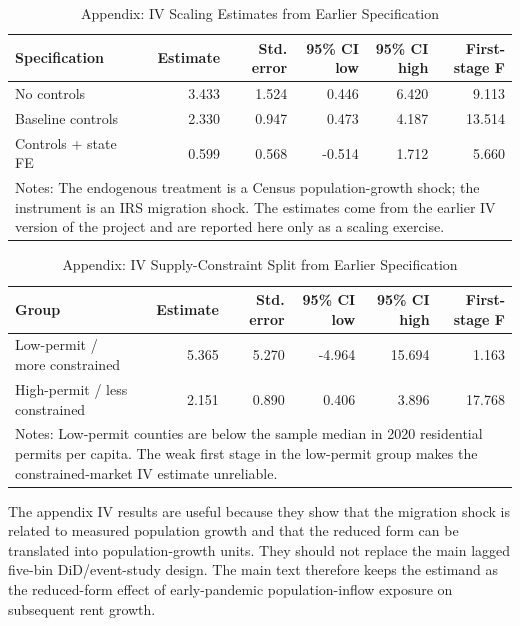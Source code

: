 \documentclass[11pt]{article}
\begin{document}
\begin{table}[H]\centering
\caption{Appendix: IV Scaling Estimates from Earlier Specification}
\label{tab:iv_appendix}
\begin{tabular}{lrrrrr}
\toprule
Specification & Estimate & Std. error & 95\% CI low & 95\% CI high & First-stage F \\
\midrule
No controls & 3.433 & 1.524 & 0.446 & 6.420 & 9.113 \\
Baseline controls & 2.330 & 0.947 & 0.473 & 4.187 & 13.514 \\
Controls + state FE & 0.599 & 0.568 & -0.514 & 1.712 & 5.660 \\
\bottomrule
\multicolumn{6}{p{0.88\textwidth}}{\footnotesize Notes: The endogenous treatment is a Census population-growth shock; the instrument is an IRS migration shock. The estimates come from the earlier IV version of the project and are reported here only as a scaling exercise.}
\end{tabular}
\end{table}

\begin{table}[H]\centering
\caption{Appendix: IV Supply-Constraint Split from Earlier Specification}
\label{tab:iv_supply_appendix}
\begin{tabular}{lrrrrr}
\toprule
Group & Estimate & Std. error & 95\% CI low & 95\% CI high & First-stage F \\
\midrule
Low-permit / more constrained & 5.365 & 5.270 & -4.964 & 15.694 & 1.163 \\
High-permit / less constrained & 2.151 & 0.890 & 0.406 & 3.896 & 17.768 \\
\bottomrule
\multicolumn{6}{p{0.88\textwidth}}{\footnotesize Notes: Low-permit counties are below the sample median in 2020 residential permits per capita. The weak first stage in the low-permit group makes the constrained-market IV estimate unreliable.}
\end{tabular}
\end{table}

The appendix IV results are useful because they show that the migration shock is related to measured population growth and that the reduced form can be translated into population-growth units. They should not replace the main lagged five-bin DiD/event-study design. The main text therefore keeps the estimand as the reduced-form effect of early-pandemic population-inflow exposure on subsequent rent growth.
\end{document}
